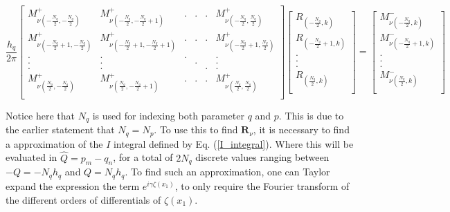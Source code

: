 \documentclass[../main.tex]{subfiles}
\begin{document}
\hspace{-1cm} \begin{equation}
    \frac{h_q}{2\pi}
    \begin{bmatrix}
    M^+_{\nu({-\frac{N_q}{2}}, {-\frac{N_q}{2}})} & M^+_{\nu({-\frac{N_q}{2}},{-\frac{N_q}{2}+1})} & . & . & . & M^+_{\nu({-\frac{N_q}{2}}, {\frac{N_q}{2}})}\\
    M^+_{\nu({-\frac{N_q}{2}+1}, {-\frac{N_q}{2}})} & M^+_{\nu({-\frac{N_q}{2}+1},{-\frac{N_q}{2}+1})} & . & . & . & M^+_{\nu({-\frac{N_q}{2}+1}, {\frac{N_q}{2}})}\\
    . & . & . &  &  & . \\
    . & . &  & . &  & . \\
    . & . &  &  & . & . \\
    M^+_{\nu({\frac{N_q}{2}}, {-\frac{N_q}{2}})} & M^+_{\nu({\frac{N_q}{2}},{-\frac{N_q}{2}+1})} & . & . & . & M^+_{\nu({\frac{N_q}{2}}, {\frac{N_q}{2}})}\\
    \end{bmatrix}
    \begin{bmatrix}
        R_{(-\frac{N_q}{2},k)}\\
        R_{(-\frac{N_q}{2}+1,k)}\\
        .\\
        .\\
        .\\
        R_{(\frac{N_q}{2},k)}\\
    \end{bmatrix}
    =
    \begin{bmatrix}
        M^-_{\nu(-\frac{N_q}{2},k)}\\
        M^-_{\nu(-\frac{N_q}{2}+1,k)}\\
        .\\
        .\\
        .\\
        M^-_{\nu(\frac{N_q}{2},k)}\\
    \end{bmatrix}
\label{R_Matrix_equation}
\end{equation}

Notice here that $N_q$ is used for indexing both parameter $q$ and $p$. This is due to the earlier statement that $N_q = N_p$. To use this to find $\boldsymbol{R}_{\nu}$, it is necessary to find a approximation of the $I$ integral defined by Eq. (\ref{I_integral}). Where this will be evaluated in $\hat{Q} =p_m - q_n $, for a total of $2 N_q$ discrete values ranging between $-Q = -N_q h_q$ and $Q = N_q h_q$.
To find such an approximation, one can Taylor expand the expression the term $e^{i\gamma\zeta(x_1)}$, to only require the Fourier transform of the different orders of differentials of $\zeta(x_1)$.
\end{document}
